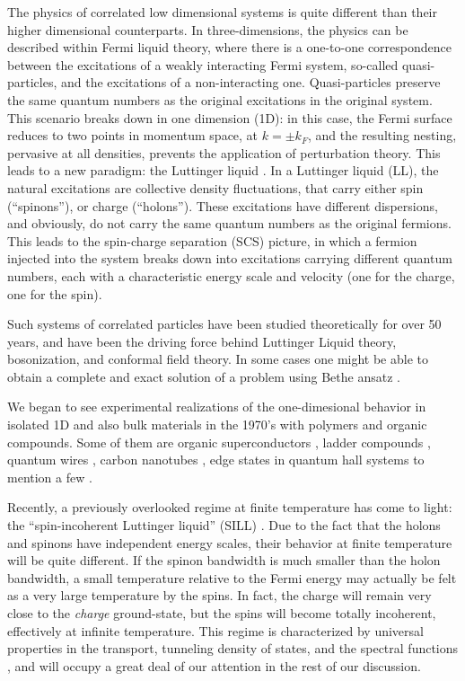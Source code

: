 \documentclass[article,11pt]{revtex4}
\begin{document}
The physics of correlated low dimensional systems is quite different than their higher dimensional counterparts. In three-dimensions, the physics can be described within Fermi liquid theory, where there is a one-to-one correspondence
between the excitations of a weakly interacting Fermi system, so-called
quasi-particles, and the excitations of a non-interacting one. Quasi-particles preserve the same quantum numbers as the original excitations in the original system. This scenario breaks down in one dimension (1D): in
this case, the Fermi surface reduces to two points in momentum space, at
$k=\pm k_F$, and the resulting nesting, pervasive at all densities,
prevents the application of perturbation theory. This leads to a
new paradigm: the Luttinger liquid \cite{Haldane1981,Gogolin,GiamarchiBook}. In a Luttinger liquid (LL), the natural
excitations are collective density fluctuations, that carry either spin
(``spinons''), or charge (``holons''). These excitations have different
dispersions, and obviously, do not carry the same quantum numbers as the
original fermions. This leads to the spin-charge separation (SCS) picture, in
which a fermion injected into the system breaks down into excitations carrying different quantum numbers, each with a characteristic energy scale and velocity (one for the charge, one for the spin).

 Such systems of correlated particles have been studied theoretically for over 50 years, and have been the driving force behind Luttinger Liquid theory, bosonization, and conformal field theory. In some cases one might be able to obtain a complete and exact solution of a problem using Bethe ansatz \cite{TakahashiBook}. 

We began to see experimental realizations of the one-dimesional behavior in isolated 1D and also bulk materials in the 1970's with polymers and organic compounds. Some of them are organic superconductors \cite{ChemRev}, ladder compounds \cite{Dagotto1996}, quantum wires \cite{Fisher1997}, carbon nanotubes \cite{Dress1995}, edge states in quantum hall systems \cite{Pitaevskii,Greiner} to mention a few \cite{GiamarchiBook}.

Recently, a previously overlooked regime at finite temperature has come to
light: the ``spin-incoherent Luttinger liquid'' (SILL) \cite{Matveev2004,Fiete2004,Cheianov2004,Cheianov2005,Fiete2007b,Halperin2007}.
Due to the fact that the holons and spinons have independent energy scales, their behavior at finite temperature will be quite different. 
If the spinon bandwidth is much smaller than the holon bandwidth, a small temperature relative to the Fermi energy may actually be felt as a very large temperature by the spins. In fact, the charge will remain very close to the {\it charge} ground-state, but the spins will become totally incoherent, effectively at infinite temperature.
 This regime is characterized by universal properties in the transport, tunneling density of states, and the spectral functions \cite{Fiete2007b}, and will occupy a great deal of our attention in the rest of our discussion.
\end{document}
